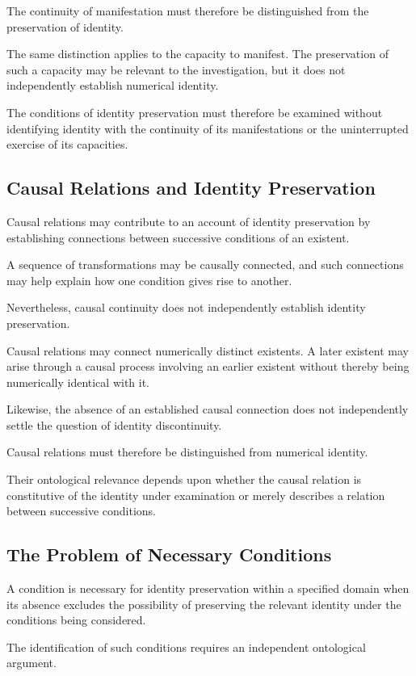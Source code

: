 The continuity of manifestation must therefore
be distinguished from the preservation of identity.

The same distinction applies to the capacity
to manifest. The preservation of such a capacity
may be relevant to the investigation, but it
does not independently establish numerical identity.

The conditions of identity preservation must
therefore be examined without identifying identity
with the continuity of its manifestations or
the uninterrupted exercise of its capacities.

\subsection{Causal Relations and Identity Preservation}

Causal relations may contribute to an account
of identity preservation by establishing connections
between successive conditions of an existent.

A sequence of transformations may be causally
connected, and such connections may help explain
how one condition gives rise to another.

Nevertheless, causal continuity does not independently
establish identity preservation.

Causal relations may connect numerically distinct
existents. A later existent may arise through
a causal process involving an earlier existent
without thereby being numerically identical with it.

Likewise, the absence of an established causal
connection does not independently settle the
question of identity discontinuity.

Causal relations must therefore be distinguished
from numerical identity.

Their ontological relevance depends upon whether
the causal relation is constitutive of the identity
under examination or merely describes a relation
between successive conditions.

\subsection{The Problem of Necessary Conditions}

A condition is necessary for identity preservation
within a specified domain when its absence excludes
the possibility of preserving the relevant identity
under the conditions being considered.

The identification of such conditions requires
an independent ontological argument.

